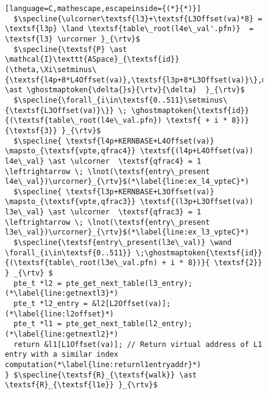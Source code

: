 \begin{figure}
\begin{lstlisting}[language=C,mathescape,escapeinside={(*}{*)}]
  $\specline{\ulcorner\textsf{l3}+\textsf{L3Offset(va)*8} = \textsf{l3p} \land \textsf{table\_root(l4e\_val'.pfn)}  = \textsf{l3} \urcorner }_{\rtv}$
  $\specline{\textsf{P} \ast \mathcal{I}\texttt{ASpace}_{\textsf{id}}(\theta,\Xi\setminus\{\textsf{l4p+8*L4Offset(va)},\textsf{l3p+8*L3Offset(va)}\},m)  \ast \ghostmaptoken{\delta{}s}{\rtv}{\delta}  }_{\rtv}$
  $\specline{\forall_{i\in\textsf{0..511}\setminus\{\textsf{L3Offset(va)}\}} \; \ghostmaptoken{\textsf{id}}{(\textsf{table\_root(l4e\_val.pfn}) \textsf{ + i * 8})} {\textsf{3}} }_{\rtv}$
  $\specline{ \textsf{l4p+KERNBASE+L4Offset(va)} \mapsto_{\textsf{vpte,qfrac4}} \textsf{(l4p+L4Offset(va)) l4e\_val} \ast \ulcorner  \textsf{qfrac4} = 1 \leftrightarrow \; \lnot(\textsf{entry\_present l4e\_val})\urcorner}_{\rtv}$(*\label{line:ex_l4_vpteC}*)
  $\specline{ \textsf{l3p+KERNBASE+L3Offset(va)} \mapsto_{\textsf{vpte,qfrac3}} \textsf{(l3p+L3Offset(va)) l3e\_val} \ast \ulcorner  \textsf{qfrac3} = 1 \leftrightarrow \; \lnot(\textsf{entry\_present l3e\_val})\urcorner}_{\rtv}$(*\label{line:ex_l3_vpteC}*)
  $\specline{\textsf{entry\_present(l3e\_val)} \wand \forall_{i\in\textsf{0..511}} \;\ghostmaptoken{\textsf{id}}{(\textsf{table\_root(l3e\_val.pfn) + i * 8})}{ \textsf{2}} } _{\rtv} $
  pte_t *l2 = pte_get_next_table(l3_entry);(*\label{line:getnextl3}*)
  pte_t *l2_entry = &l2[L2Offset(va)];(*\label{line:l2offset}*)
  pte_t *l1 = pte_get_next_table(l2_entry);(*\label{line:getnextl2}*)
  return &l1[L1Offset(va)]; // Return virtual address of L1 entry with a similar index computation(*\label{line:returnl1entryaddr}*)
} $\specline{\textsf{R}_{\textsf{walk}} \ast \textsf{R}_{\textsf{l1e}} }_{\rtv}$
\end{lstlisting}
\else
{}

\end{figure}
